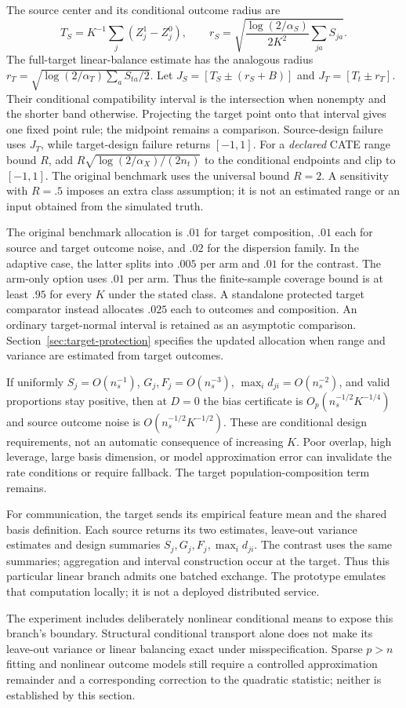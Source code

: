 The source center and its conditional outcome radius are
\[
 T_S=K^{-1}\sum_j(Z_j^1-Z_j^0),\qquad
 r_S=\sqrt{\frac{\log(2/\alpha_S)}{2K^2}\sum_{ja}S_{ja}}.
\]
The full-target linear-balance estimate has the analogous radius
$r_T=\sqrt{\log(2/\alpha_T)\sum_aS_{ta}/2}$.
Let $J_S=[T_S\pm(r_S+B)]$ and $J_T=[T_t\pm r_T]$. Their conditional
compatibility interval is the intersection when nonempty and the shorter band
otherwise. Projecting the target point onto that interval gives one fixed
point rule; the midpoint remains a comparison. Source-design failure uses
$J_T$, while target-design failure returns $[-1,1]$. For a \emph{declared} CATE range bound $R$, add
$R\sqrt{\log(2/\alpha_X)/(2n_t)}$ to the conditional endpoints and clip to
$[-1,1]$. The original benchmark uses the universal bound $R=2$. A sensitivity
with $R=.5$ imposes an extra class assumption; it is not an estimated range or
an input obtained from the simulated truth.

The original benchmark allocation is $.01$ for target composition, $.01$ each for
source and target outcome noise, and $.02$ for the dispersion family. In the
adaptive case, the latter splits into $.005$ per arm and $.01$ for the contrast.
The arm-only option uses $.01$ per arm. Thus the finite-sample coverage bound
is at least $.95$ for every $K$ under the stated class. A standalone protected
target comparator instead allocates $.025$ each to outcomes and composition.
An ordinary target-normal interval is retained as an asymptotic comparison.
Section~\ref{sec:target-protection} specifies the updated allocation when
range and variance are estimated from target outcomes.

If uniformly $S_j=O(n_s^{-1})$, $G_j,F_j=O(n_s^{-3})$,
$\max_i d_{ji}=O(n_s^{-2})$, and valid proportions stay positive, then at
$D=0$ the bias certificate is $O_p(n_s^{-1/2}K^{-1/4})$ and source outcome
noise is $O(n_s^{-1/2}K^{-1/2})$. These are conditional design requirements,
not an automatic consequence of increasing $K$. Poor overlap, high leverage,
large basis dimension, or model approximation error can invalidate the rate
conditions or require fallback. The target population-composition term remains.

For communication, the target sends its empirical feature mean and the shared
basis definition. Each source returns its two estimates, leave-out variance
estimates and design summaries $S_j,G_j,F_j,\max_i d_{ji}$. The contrast uses
the same summaries; aggregation and interval construction occur at the target.
Thus this particular linear branch admits one batched exchange. The prototype
emulates that computation locally; it is not a deployed distributed service.

The experiment includes deliberately nonlinear conditional means to expose
this branch's boundary. Structural conditional transport alone does not make
its leave-out variance or linear balancing exact under misspecification.
Sparse $p>n$ fitting and nonlinear outcome models still require a controlled
approximation remainder and a corresponding correction to the quadratic
statistic; neither is established by this section.
